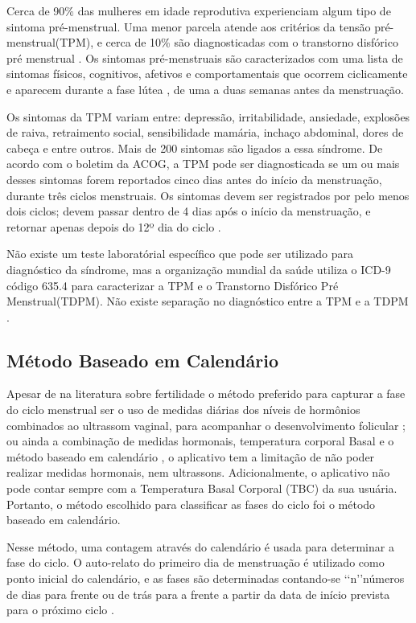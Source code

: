 Cerca de 90\% das mulheres em idade reprodutiva experienciam algum tipo de 
sintoma pré-menstrual. Uma menor parcela atende aos critérios da tensão 
pré-menstrual(TPM), e cerca de 10\% são diagnosticadas com o transtorno 
disfórico pré menstrual \cite{mishell2005}. Os sintomas pré-menstruais 
são caracterizados com uma lista de sintomas físicos, cognitivos, 
afetivos e comportamentais que ocorrem ciclicamente e aparecem durante a 
fase lútea \cite{obrien2011}, de uma a duas semanas antes da menstruação. 

Os sintomas da TPM variam entre: depressão, irritabilidade, ansiedade, 
explosões de raiva, retraimento social, sensibilidade mamária, 
inchaço abdominal, dores de cabeça e entre outros. Mais de 200 sintomas 
são ligados a essa síndrome. De acordo com o boletim da ACOG, a TPM pode 
ser diagnosticada se um ou mais desses sintomas forem reportados cinco dias 
antes do início da menstruação, durante três ciclos menstruais. Os sintomas 
devem ser registrados por pelo menos dois ciclos; devem passar dentro de 
4 dias após o início da menstruação, e retornar apenas depois do 12º dia do 
ciclo \cite{ACOG2000}.

Não existe um teste laboratórial específico que pode ser utilizado para 
diagnóstico da síndrome, mas a organização mundial da saúde utiliza o ICD-9 
código 635.4 para caracterizar a TPM e o Transtorno Disfórico Pré Menstrual(TDPM). Não existe separação no diagnóstico entre a TPM e a TDPM \cite{biggs2011}.

\subsection{Método Baseado em Calendário}

Apesar de na literatura sobre fertilidade o método preferido para capturar 
a fase do ciclo menstrual ser o uso de medidas diárias dos níveis 
de hormônios combinados ao ultrassom vaginal, para acompanhar o 
desenvolvimento folicular \cite{ecochard2001}; ou ainda a
combinação de medidas hormonais, temperatura corporal Basal e o método 
baseado em calendário \cite{becker2005}, o aplicativo tem a limitação de 
não poder realizar medidas hormonais, nem ultrassons. Adicionalmente, 
o aplicativo não pode contar sempre com a Temperatura Basal Corporal (TBC) 
da sua usuária. Portanto, o método escolhido para classificar as 
fases do ciclo foi o método baseado em calendário.


Nesse método, uma contagem através do calendário é usada para determinar 
a fase do ciclo. O auto-relato do primeiro dia de menstruação é 
utilizado como ponto inicial do calendário, e as fases são determinadas 
contando-se \lq \lq n\rq \rq  números de dias para frente ou de trás para 
a frente a partir da data de início prevista para o próximo ciclo \cite{wideman2013}.



